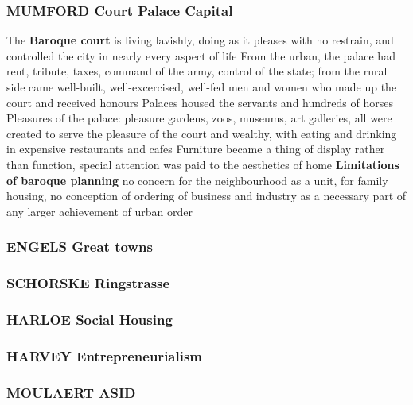 \documentclass{article}
\begin{document}
\subsubsection{MUMFORD Court Palace Capital}

\begin{outline}
	\1 The \textbf{Baroque court} is living lavishly, doing as it pleases with no restrain, and controlled the city in nearly every aspect of life
		\2 From the urban, the palace had rent, tribute, taxes, command of the army, control of the state; from the rural side came well-built, well-excercised, well-fed men and women who made up the court and received honours
		\2 Palaces housed the servants and hundreds of horses
	\1 Pleasures of the palace: pleasure gardens, zoos, museums, art galleries, all were created to serve the pleasure of the court and wealthy, with eating and drinking in expensive restaurants and cafes
		\2 Furniture became a thing of display rather than function, special attention was paid to the aesthetics of home
	\1 \textbf{Limitations of baroque planning} no concern for the neighbourhood as a unit, for family housing, no conception of ordering of business and industry as a necessary part of any larger achievement of urban order
\end{outline}


\subsubsection{ENGELS Great towns}

\subsubsection{SCHORSKE Ringstrasse}

\subsubsection{HARLOE Social Housing}

\subsubsection{HARVEY Entrepreneurialism}

\subsubsection{MOULAERT ASID}



\begin{comment}
\begin{chronology}[10]{1900}{2010}{100ex}[\textwidth]
\event{1930}{Bismarckian (pioneers)}
\event{1960}{Beveridgian (divergence)}
\event{1997}{Convergence}
\end{chronology}
\end{comment}

\printbibliography
\end{document}
